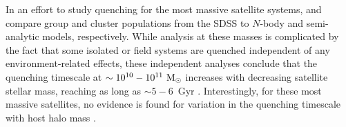 \documentclass[usenatbib]{mn2e}
\newcommand{\msun}{{\rm M}_{\odot}}
\begin{document}
In an effort to study quenching for the most massive satellite
systems, \citet{wetzel13} and \citet{delucia12} compare group and
cluster populations from the SDSS \citep{yang07} to $N$-body and
semi-analytic models, respectively. While analysis at these masses is
complicated by the fact that some isolated or field systems are
quenched independent of any environment-related effects, these
independent analyses conclude that the quenching timescale at
$\sim10^{10}-10^{11}~\msun$ increases with decreasing satellite
stellar mass, reaching as long as $\sim 5-6$~Gyr \citep[see
also][]{hirschmann14}. Interestingly, for these most massive
satellites, no evidence is found for variation in the quenching
timescale with host halo mass \citep[][but see also
\citealt{phillips15}]{wetzel13}.
\end{document}
